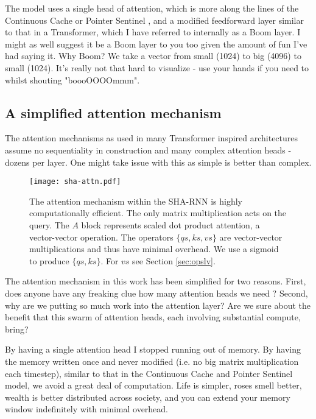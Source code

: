 \documentclass{article}
\begin{document}
The model uses a single head of attention, which is more along the lines of the Continuous Cache \citep{Grave2016} or Pointer Sentinel \citep{Merity2016}, and a modified feedforward layer similar to that in a Transformer, which I have referred to internally as a Boom layer.
I might as well suggest it be a Boom layer to you too given the amount of fun I've had saying it.
Why Boom?
We take a vector from small (1024) to big (4096) to small (1024).
It's really not that hard to visualize - use your hands if you need to whilst shouting "boooOOOOmmm".

\subsection{A simplified attention mechanism}

The attention mechanisms as used in many Transformer inspired architectures assume no sequentiality in construction and many complex attention heads - dozens per layer.
One might take issue with this as simple is better than complex.


\begin{figure}[t]
 \centering 
 \texttt{[image: sha-attn.pdf]}
\caption{
The attention mechanism within the SHA-RNN is highly computationally efficient.
The only matrix multiplication acts on the query.
The $A$ block represents scaled dot product attention, a vector-vector operation.
The operators $\{qs, ks, vs\}$ are vector-vector multiplications and thus have minimal overhead.
We use a sigmoid to produce $\{qs, ks\}$.
For $vs$ see Section \ref{sec:opslv}.
}
\label{fig:attn}
\end{figure}

The attention mechanism in this work has been simplified for two reasons.
First, does anyone have any freaking clue how many attention heads we need \cite{shazeer2019fast}?
Second, why are we putting so much work into the attention layer?
Are we sure about the benefit that this swarm of attention heads, each involving substantial compute, bring?

By having a single attention head I stopped running out of memory.
By having the memory written once and never modified (i.e. no big matrix multiplication each timestep), similar to that in the Continuous Cache and Pointer Sentinel model, we avoid a great deal of computation.
Life is simpler, roses smell better, wealth is better distributed across society, and you can extend your memory window indefinitely with minimal overhead.
\end{document}

